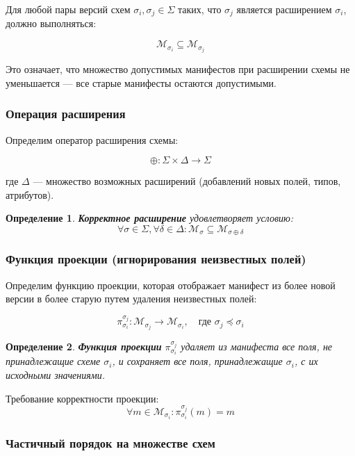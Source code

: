 \documentclass{article}
\newtheorem{definition}{Определение}
\begin{document}
Для любой пары версий схем $\sigma_i, \sigma_j \in \Sigma$ таких, что $\sigma_j$ является расширением $\sigma_i$, должно выполняться:

\[
\mathcal{M}_{\sigma_i} \subseteq \mathcal{M}_{\sigma_j}
\]

Это означает, что множество допустимых манифестов при расширении схемы не уменьшается — все старые манифесты остаются допустимыми.

\subsubsection{Операция расширения}

Определим оператор расширения схемы:

\[
\oplus: \Sigma \times \Delta \to \Sigma
\]


где $\Delta$ — множество возможных расширений (добавлений новых полей, типов, атрибутов).

\begin{definition}
\textbf{Корректное расширение} удовлетворяет условию:
\[
\forall \sigma \in \Sigma, \forall \delta \in \Delta: \mathcal{M}_{\sigma} \subseteq \mathcal{M}_{\sigma \oplus \delta}
\]
\end{definition}

\subsubsection{Функция проекции (игнорирования неизвестных полей)}

Определим функцию проекции, которая отображает манифест из более новой версии в более старую путем удаления неизвестных полей:

\[
\pi_{\sigma_i}^{\sigma_j}: \mathcal{M}_{\sigma_j} \to \mathcal{M}_{\sigma_i}, \quad \text{где } \sigma_j \preceq \sigma_i
\]

\begin{definition}
\textbf{Функция проекции} $\pi_{\sigma_i}^{\sigma_j}$ удаляет из манифеста все поля, не принадлежащие схеме $\sigma_i$, и сохраняет все поля, принадлежащие $\sigma_i$, с их исходными значениями.
\end{definition}

Требование корректности проекции:
\[
\forall m \in \mathcal{M}_{\sigma_i}: \pi_{\sigma_i}^{\sigma_j}(m) = m
\]

\subsubsection{Частичный порядок на множестве схем}
\end{document}
